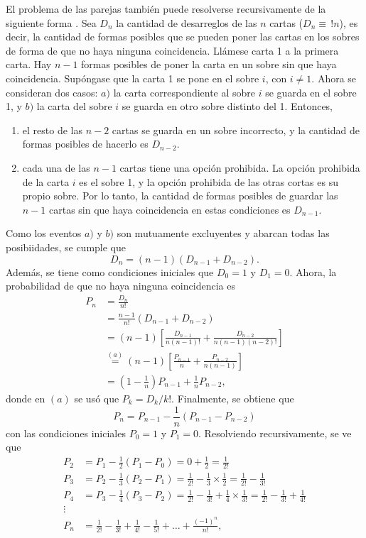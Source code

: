 \documentclass[a4paper]{report}
\begin{document}
El problema de las parejas también puede resolverse recursivamente de la siguiente forma \cite{hathout2003old}. Sea \(D_n\) la cantidad de desarreglos de las \(n\) cartas (\(D_n\equiv\,!n\)), es decir, la cantidad de formas posibles que se pueden poner las cartas en los sobres de forma de que no haya ninguna coincidencia. Llámese carta 1 a la primera carta. Hay \(n-1\) formas posibles de poner la carta en un sobre sin que haya coincidencia. Supóngase que la carta 1 se pone en el sobre \(i\), con \(i\neq 1\). Ahora se consideran dos casos: \(a)\) la carta correspondiente al sobre \(i\) se guarda en el sobre 1, y \(b)\) la carta del sobre \(i\) se guarda en otro sobre distinto del 1. Entonces,
\begin{enumerate}[\(a)\)]
 \item el resto de las \(n-2\) cartas se guarda en un sobre incorrecto, y la cantidad de formas posibles de hacerlo es \(D_{n-2}\).
 \item cada una de las \(n-1\) cartas tiene una opción prohibida. La opción prohibida de la carta \(i\) es el sobre 1, y la opción prohibida de las otras cortas es su propio sobre. Por lo tanto, la cantidad de formas posibles de guardar las \(n-1\) cartas sin que haya coincidencia en estas condiciones es \(D_{n-1}\).
\end{enumerate}
Como los eventos \(a)\) y \(b)\) son mutuamente excluyentes y abarcan todas las posibiidades, se cumple que
\[
 D_n=(n-1)\left(D_{n-1}+D_{n-2}\right).
\]
Además, se tiene como condiciones iniciales que \(D_0=1\) y \(D_1=0\). Ahora, la probabilidad de que no haya ninguna coincidencia es
\begin{align*}
 P_n&=\frac{D_n}{n!}\\
  &=\frac{n-1}{n!}\left(D_{n-1}+D_{n-2}\right)\\
  &=(n-1)\left[\frac{D_{n-1}}{n(n-1)!}+\frac{D_{n-2}}{n(n-1)(n-2)!}\right]\\
  &\overset{(a)}{=}(n-1)\left[\frac{P_{n-1}}{n}+\frac{P_{n-2}}{n(n-1)}\right]\\
  &=\left(1-\frac{1}{n}\right)P_{n-1}+\frac{1}{n}P_{n-2},
\end{align*}
donde en \((a)\) se usó que \(P_k=D_k/k!\). Finalmente, se obtiene que
\[
 P_n=P_{n-1}-\frac{1}{n}\left(P_{n-1}-P_{n-2}\right)
\]
con las condiciones iniciales \(P_0=1\) y \(P_1=0\). Resolviendo recursivamente, se ve que
\begin{align*}
 P_2&=P_1-\frac{1}{2}\left(P_1-P_0\right)=0+\frac{1}{2}=\frac{1}{2!}\\
 P_3&=P_2-\frac{1}{3}\left(P_2-P_1\right)=\frac{1}{2!}-\frac{1}{3}\times\frac{1}{2}=\frac{1}{2!}-\frac{1}{3!}\\
 P_4&=P_3-\frac{1}{4}\left(P_3-P_2\right)=\frac{1}{2!}-\frac{1}{3!}+\frac{1}{4}\times\frac{1}{3!}=\frac{1}{2!}-\frac{1}{3!}+\frac{1}{4!}\\
 \vdots&\\
 P_n&=\frac{1}{2!}-\frac{1}{3!}+\frac{1}{4!}-\frac{1}{5!}+\dots+\frac{(-1)^n}{n!},
\end{align*}
\end{document}
